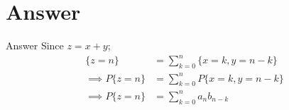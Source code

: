 \documentclass{beamer}
\begin{document}
	\section{Answer}
	\begin{frame}{Answer}
	   Since $z=x+y$;\\
	   \begin{align}
	   \{z=n\}  &= \sum\limits^{n}_{k=0}\{x=k,y=n-k\}\\
       \implies P\{z=n\} &= \sum\limits^{n}_{k=0}P\{x=k,y=n-k\}\\
       \implies P\{z=n\} &= \sum\limits^{n}_{k=0}a_n b_{n-k}
	   \end{align}
	\end{frame}
	
\end{document}
